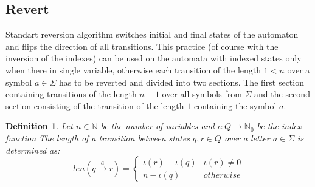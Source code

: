 \documentclass[pdflatex,sn-mathphys-num]{sn-jnl}%
\theoremstyle{thmstyleone}%
\theoremstyle{thmstyletwo}%
\theoremstyle{thmstylethree}%
\newtheorem{definition}{Definition}%
\begin{document}
    \subsection{Revert}
        Standart reversion algorithm switches initial and final states of the automaton and flips the direction of all transitions. This practice (of course with the inversion of the indexes) can be used on the automata with indexed states only when there in single variable, otherwise each transition of the length $1 < n$ over a symbol $a \in \Sigma$ has to be reverted and divided into two sections. The first section containing transitions of the length $n - 1$ over all symbols from $\Sigma$ and the second section consisting of the transition of the length $1$ containing the symbol $a$.

        \vspace*{0.5em}

        \begin{definition}
            Let $n \in \mathbb{N}$ be the number of variables and $\iota : Q \rightarrow \mathbb{N}_0$ be the index function The length of a transition between states $q, r \in Q$ over a letter $a \in \Sigma$ is determined as:
            $$
            len(q \xrightarrow[]{a} r) =
            \begin{cases}
                \iota(r) - \iota(q) & \iota(r) \neq 0\\
                n - \iota(q) & otherwise
            \end{cases}
            $$
        \end{definition}

        \vspace*{0.5em}
\end{document}
